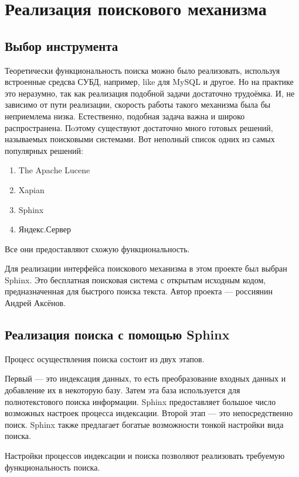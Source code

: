 \section{Реализация поискового механизма}


\subsection{Выбор инструмента}

Теоретически функциональность поиска можно было реализовать, используя
встроенные средсва СУБД, например, like для MySQL и другое.
Но на практике это неразумно, так как реализация подобной задачи 
достаточно трудоёмка.
И, не зависимо от пути реализации, скорость работы такого механизма была бы неприемлема низка.
Естественно, подобная задача важна и широко распространена.
Пoэтому существуют достаточно много готовых решений, называемых поисковыми системами.
Вот неполный список одних из самых популярных решений:
\begin{enumerate}
    \item The Apache Lucene 
    \item Xapian
    \item Sphinx
    \item Яндекс.Сервер
\end{enumerate}

Все они предоставляют схожую функциональность.

Для реализации интерфейса поискового механизма в этом проекте был выбран Sphinx. 
Это бесплатная поисковая система с открытым исходным кодом, 
предназначенная для быстрого поиска текста. 
Автор проекта --- россиянин Андрей Аксёнов.

\subsection{Реализация поиска с помощью Sphinx}

Процесс осуществления поиска состоит из двух этапов.

Первый --- это индексация данных, то есть преобразование входных данных и добавление их в некоторую базу.
Затем эта база используется для полнотекстового поиска информации.
Sphinx предоставляет большое число возможных настроек процесса индексации.
Второй этап --- это непосредственно поиск. Sphinx также предлагает богатые возможности тонкой настройки вида поиска.

Настройки процессов индексации и поиска позволяют реализовать требуемую функциональность поиска.

